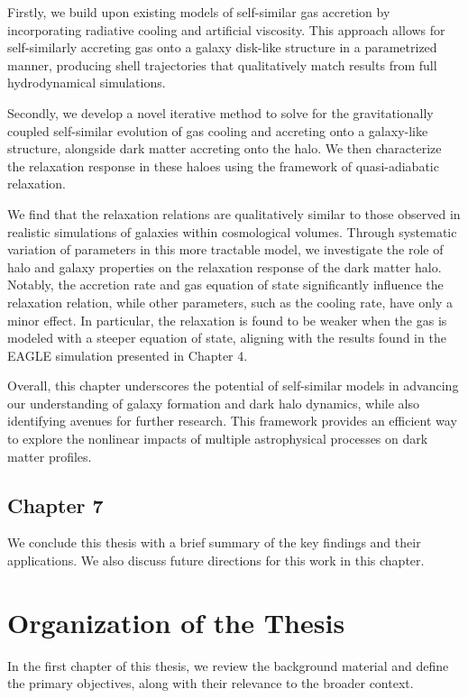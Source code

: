 \documentclass[a4paper, 12pt, oneside]{Thesis}  %
\begin{document}
Firstly, we build upon existing models of self-similar gas accretion by incorporating radiative cooling and artificial viscosity. This approach allows for self-similarly accreting gas onto a galaxy disk-like structure in a parametrized manner, producing shell trajectories that qualitatively match results from full hydrodynamical simulations.

Secondly, we develop a novel iterative method to solve for the gravitationally coupled self-similar evolution of gas cooling and accreting onto a galaxy-like structure, alongside dark matter accreting onto the halo. We then characterize the relaxation response in these haloes using the framework of quasi-adiabatic relaxation.

We find that the relaxation relations are qualitatively similar to those observed in realistic simulations of galaxies within cosmological volumes. Through systematic variation of parameters in this more tractable model, we investigate the role of halo and galaxy properties on the relaxation response of the dark matter halo. Notably, the accretion rate and gas equation of state significantly influence the relaxation relation, while other parameters, such as the cooling rate, have only a minor effect. In particular, the relaxation is found to be weaker when the gas is modeled with a steeper equation of state, aligning with the results found in the EAGLE simulation presented in Chapter 4.

Overall, this chapter underscores the potential of self-similar models in advancing our understanding of galaxy formation and dark halo dynamics, while also identifying avenues for further research. This framework provides an efficient way to explore the nonlinear impacts of multiple astrophysical processes on dark matter profiles.


\subsection*{Chapter 7}

We conclude this thesis with a brief summary of the key findings and their applications. We also discuss future directions for this work in this chapter.

\section*{Organization of the Thesis}

In the first chapter of this thesis, we review the background material and define the primary objectives, along with their relevance to the broader context.
\end{document}
